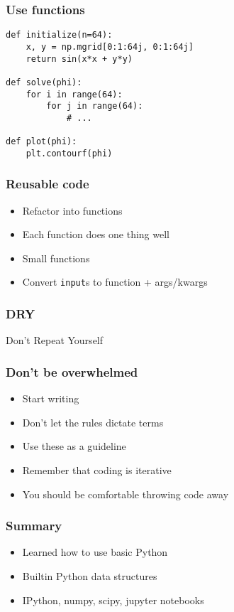 \documentclass[14pt,compress]{beamer}
\begin{document}
\begin{frame}[fragile]
  \frametitle{Use functions}
\begin{lstlisting}
def initialize(n=64):
    x, y = np.mgrid[0:1:64j, 0:1:64j]
    return sin(x*x + y*y)

def solve(phi):
    for i in range(64):
        for j in range(64):
            # ...

def plot(phi):
    plt.contourf(phi)
\end{lstlisting}
\end{frame}

\begin{frame}
  \frametitle{Reusable code}
  \begin{itemize}
  \item Refactor into functions
  \item Each function does one thing well
  \item Small functions
  \item Convert \lstinline{input}s to function + args/kwargs
  \end{itemize}
\end{frame}


\begin{frame}
  \frametitle{DRY}

  \begin{center}
    Don't Repeat Yourself
  \end{center}
\end{frame}

\begin{frame}
  \frametitle{Don't be overwhelmed}
  \begin{itemize}
  \item Start writing
  \item Don't let the rules dictate terms
  \item Use these as a guideline
  \item Remember that coding is iterative
  \item You should be comfortable throwing code away
  \end{itemize}
\end{frame}



\begin{frame}[fragile]
  \frametitle{Summary}
  \begin{itemize}
  \item Learned how to use basic Python
  \item Builtin Python data structures
  \item IPython, numpy, scipy, jupyter notebooks
  \end{itemize}
\end{frame}
\end{document}
